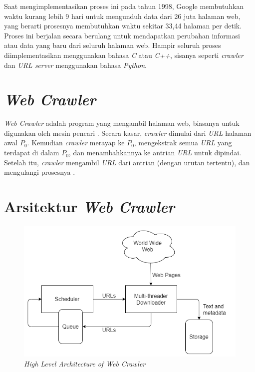 Saat mengimplementasikan proses ini pada tahun 1998, Google membutuhkan waktu kurang lebih 9 hari untuk mengunduh data dari 26 juta halaman web, yang berarti prosesnya membutuhkan waktu sekitar 33,44 halaman per detik. Proses ini berjalan secara berulang untuk mendapatkan perubahan informasi atau data yang baru dari seluruh halaman web. Hampir seluruh proses diimplementasikan menggunakan bahasa \textit{C} atau \textit{C++}, sisanya seperti \textit{crawler} dan \textit{URL server} menggunakan bahasa \textit{Python}.

\section{\emph{Web Crawler}}

\emph{Web Crawler} adalah program yang mengambil halaman web, biasanya untuk digunakan oleh mesin pencari \citep{pinkerton1994finding}. Secara kasar, \emph{crawler} dimulai dari \emph{URL} halaman awal $P_{0}$. Kemudian \emph{crawler} merayap ke $P_{0}$, mengekstrak semua \emph{URL} yang terdapat di dalam $P_{0}$, dan menambahkannya ke antrian \emph{URL} untuk dipindai. Setelah itu, \emph{crawler} mengambil \emph{URL} dari antrian (dengan urutan tertentu), dan mengulangi prosesnya \citep{cho1998efficient}.

\section{Arsitektur \emph{Web Crawler}}

\begin{figure}[H]
	\centering
	\includegraphics[keepaspectratio, width=12cm]{gambar/Arsitektur_Webcrawler}
	\caption{\emph{High Level Architecture of Web Crawler} \citep{castillo2005effective}}
	\label{gambar:architecture_webcrawler}
\end{figure}

